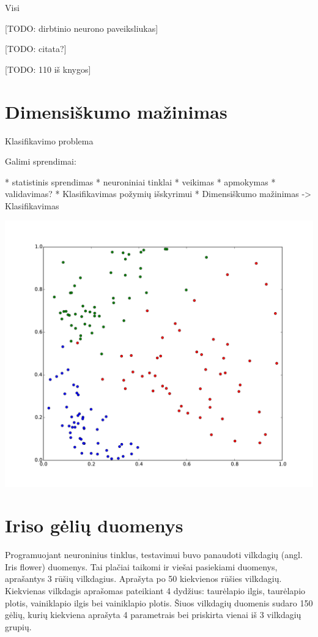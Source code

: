 \documentclass[a4paper,12pt,fleqn]{article}
\begin{document}
Visi



[TODO: dirbtinio neurono paveiksliukas]


[TODO: citata?]


[TODO: 110 iš knygos]


\section{Dimensiškumo mažinimas}


Klasifikavimo problema

Galimi sprendimai:

	* statistinis sprendimas
	* neuroniniai tinklai
		* veikimas
		* apmokymas
		* validavimas?
		* Klasifikavimas požymių išskyrimui
		* Dimensiškumo mažinimas -> Klasifikavimas



\includegraphics[width=\linewidth]{pics/classification}


\section{Iriso gėlių duomenys}

Programuojant neuroninius tinklus, testavimui buvo panaudoti vilkdagių (angl. Iris flower) duomenys.
Tai plačiai taikomi ir viešai pasiekiami duomenys, aprašantys 3 rūšių vilkdagius.
Aprašyta po 50 kiekvienos rūšies vilkdagių.
Kiekvienas vilkdagis aprašomas pateikiant 4 dydžius: taurėlapio ilgis, taurėlapio plotis, vainiklapio ilgis bei vainiklapio plotis.
Šiuos vilkdagių duomenis sudaro 150 gėlių, kurių kiekviena aprašyta 4 parametrais bei priskirta vienai iš 3 vilkdagių grupių.
\end{document}
